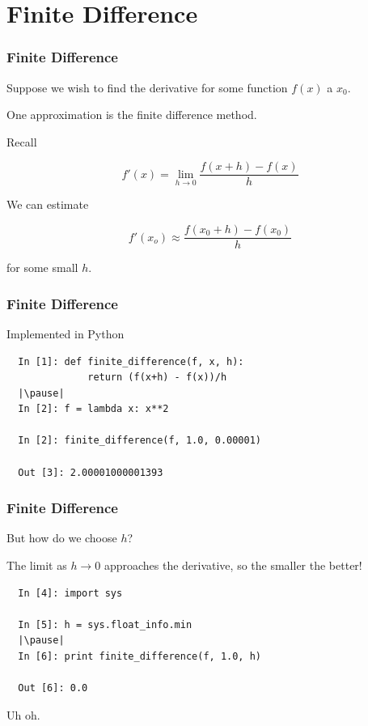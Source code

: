 \documentclass{beamer}
\begin{document}
\section{Finite Difference}

\begin{frame}
\frametitle{Finite Difference}

Suppose we wish to find the derivative for some function $f(x)$ a $x_0$.

\pause
One approximation is the finite difference method.

\pause
Recall

\[ f'(x) = \lim_{h \to 0} \frac{f(x+h)-f(x)}{h} \]

\pause
We can estimate

\[ f'(x_o) \approx \frac{f(x_0+h)-f(x_0)}{h} \]

for some small $h$.



\end{frame}

\begin{frame}[fragile]
\frametitle{Finite Difference}

Implemented in Python

\begin{lstlisting}
  In [1]: def finite_difference(f, x, h):
              return (f(x+h) - f(x))/h
  |\pause|
  In [2]: f = lambda x: x**2

  In [2]: finite_difference(f, 1.0, 0.00001)

  Out [3]: 2.00001000001393
\end{lstlisting}

\end{frame}

\begin{frame}[fragile]
\frametitle{Finite Difference}

But how do we choose $h$? \pause

The limit as $h \to 0$ approaches the derivative, so the smaller the better!

\begin{lstlisting}
  In [4]: import sys

  In [5]: h = sys.float_info.min
  |\pause|
  In [6]: print finite_difference(f, 1.0, h)

  Out [6]: 0.0
\end{lstlisting}


Uh oh.

\end{frame}
\end{document}
